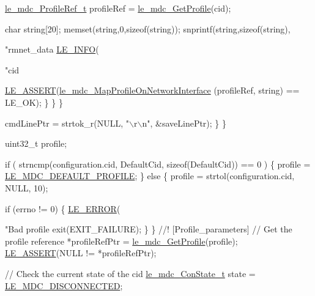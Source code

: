 \begin{DoxyCodeInclude}
{{{{                        \hyperlink{le__mdc__interface_8h_a91074d8f0d88c6645e3085dfadf87011}{le\_mdc\_ProfileRef\_t} profileRef = 
      \hyperlink{le__mdc__interface_8h_a638b693cd5f644fa5c24f81e1e36483c}{le\_mdc\_GetProfile}(cid);

                        \textcolor{keywordtype}{char} \textcolor{keywordtype}{string}[20];
                        memset(\textcolor{keywordtype}{string},0,\textcolor{keyword}{sizeof}(\textcolor{keywordtype}{string}));
                        snprintf(\textcolor{keywordtype}{string},\textcolor{keyword}{sizeof}(\textcolor{keywordtype}{string}),\textcolor{stringliteral}{"rmnet\_data%
                        \hyperlink{le__log_8h_a23e6d206faa64f612045d688cdde5808}{LE\_INFO}(\textcolor{stringliteral}{"cid %

                        \hyperlink{le__log_8h_ac0dbbef91dc0fed449d0092ff0557b39}{LE\_ASSERT}(\hyperlink{le__mdc__interface_8h_a56cd547a4e2b9cc98c1f0d052aeb92e6}{le\_mdc\_MapProfileOnNetworkInterface}
      (profileRef, \textcolor{keywordtype}{string}) == LE\_OK);
                    \}
                \}
            \}

            cmdLinePtr = strtok\_r(NULL, \textcolor{stringliteral}{"\(\backslash\)r\(\backslash\)n"}, &saveLinePtr);
        \}
    \}

    uint32\_t profile;

    \textcolor{keywordflow}{if} ( strncmp(configuration.cid, DefaultCid, \textcolor{keyword}{sizeof}(DefaultCid)) == 0 )
    \{
        profile = \hyperlink{le__mdc__interface_8h_abf72eaa8891f7591477e229bb4ad5723}{LE\_MDC\_DEFAULT\_PROFILE};
    \}
    \textcolor{keywordflow}{else}
    \{
        profile = strtol(configuration.cid, NULL, 10);

        \textcolor{keywordflow}{if} (errno != 0)
        \{
            \hyperlink{le__log_8h_a353590f91b3143a7ba3a416ae5a50c3d}{LE\_ERROR}(\textcolor{stringliteral}{"Bad profile %
            exit(EXIT\_FAILURE);
        \}
    \}
\textcolor{comment}{}
\textcolor{comment}{//! [Profile\_parameters]}
\textcolor{comment}{}
    \textcolor{comment}{// Get the profile reference}
    *profileRefPtr = \hyperlink{le__mdc__interface_8h_a638b693cd5f644fa5c24f81e1e36483c}{le\_mdc\_GetProfile}(profile);
    \hyperlink{le__log_8h_ac0dbbef91dc0fed449d0092ff0557b39}{LE\_ASSERT}(NULL != *profileRefPtr);

    \textcolor{comment}{// Check the current state of the cid}
    \hyperlink{le__mdc__interface_8h_a0727e543d0394422963c8d6297947333}{le\_mdc\_ConState\_t} state = \hyperlink{le__mdc__interface_8h_a0727e543d0394422963c8d6297947333a6d11ee963528c79d73a269eb85202ba7}{LE\_MDC\_DISCONNECTED};

}}}}}}}
\end{DoxyCodeInclude}
